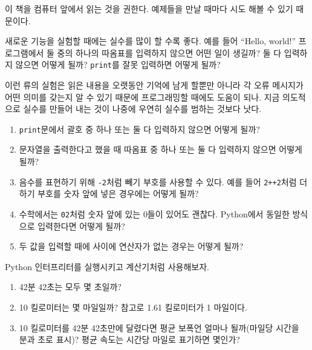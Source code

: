 \documentclass[10pt]{book}
\begin{document}
\begin{exercise}

  이 책을 컴퓨터 앞에서 읽는 것을 권한다. 예제들을 만날 때마다 시도
  해볼 수 있기 때문이다.

새로운 기능을 실험할 때에는 실수를 많이 할 수록 좋다. 예를 들어
``Hello, world!'' 프로그램에서 둘 중의 하나의 따옴표를 입력하지 않으면
어떤 일이 생길까?  둘 다 입력하지 않으면 어떻게 될까? {\tt print}를
잘못 입력하면 어떻게 될까?  

이런 류의 실험은 읽은 내용을 오랫동안 기억에 남게 할뿐만 아니라 각 오류
메시지가 어떤 의미를 갖는지 알 수 있기 때문에 프로그래밍할 때에도
도움이 되나. 지금 의도적으로 실수를 만들어 내는 것이 나중에 우연히
실수를 범하는 것보다 낫다.

\begin{enumerate}

\item \texttt{print}문에서 괄호 중 하나 또는 둘 다 입력하지 않으면 어떻게 될까?

\item 문자열을 출력한다고 했을 때 따옴표 중 하나 또는 둘 다 입력하지
  않으면 어떻게 될까?

\item 음수를 표현하기 위해 {\tt -2}처럼 빼기 부호를 사용할 수
  있다. 예를 들어 {\tt 2++2}처럼 더하기 부호를 숫자 앞에 넣은 경우에는
  어떻게 될까?

\item 수학에서는 {\tt 02}처럼 숫자 앞에 있는 0들이 있어도 괜찮다. Python에서 동일한 방식으로 입력한다면 어떻게 될까? 

\item 두 값을 입력할 때에 사이에 연산자가 없는 경우는 어떻게 될까? 

\end{enumerate}

\end{exercise}



\begin{exercise}

Python 인터프리터를 실행시키고 계산기처럼 사용해보자.

\begin{enumerate}

\item 42분 42초는 모두 몇 초일까? 

\item 10 킬로미터는 몇 마일일까? 참고로 1.61 킬로미터가 1 마일이다. 

\item 10 킬로미터를 42분 42초만에 달렸다면 평균 보폭언 얼마나
  될까(마일당 시간을 분과 초로 표시)? 평균 속도는 시간당 마일로
  표기하면 몇인가?

\end{enumerate}

\end{exercise}
\end{document}
